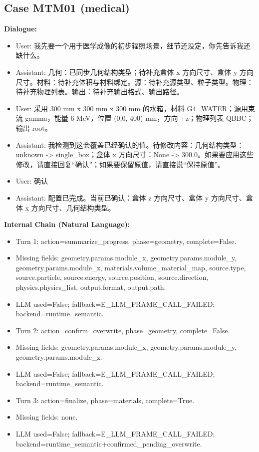 \documentclass[11pt]{ctexart}
\begin{document}
\subsection{Case MTM01 (medical)}
\textbf{Dialogue:}
\begin{itemize}
\item User: 我先要一个用于医学成像的初步辐照场景，细节还没定，你先告诉我还缺什么。
\item Assistant: 几何：已同步几何结构类型；待补充盒体 x 方向尺寸、盒体 y 方向尺寸。材料：待补充体积与材料绑定。源：待补充源类型、粒子类型。物理：待补充物理列表。输出：待补充输出格式、输出路径。
\item User: 采用 300 mm x 300 mm x 300 mm 的水箱，材料 G4\_WATER；源用束流 gamma，能量 6 MeV，位置 (0,0,-400) mm，方向 +z；物理列表 QBBC；输出 root。
\item Assistant: 我检测到这会覆盖已经确认的值。待修改内容：几何结构类型：unknown -> single\_box；盒体 x 方向尺寸：None -> 300.0。如果要应用这些修改，请直接回复“确认”；如果要保留原值，请直接说“保持原值”。
\item User: 确认
\item Assistant: 配置已完成。当前已确认：盒体 z 方向尺寸、盒体 y 方向尺寸、盒体 x 方向尺寸、几何结构类型。
\end{itemize}
\textbf{Internal Chain (Natural Language):}
\begin{itemize}
\item Turn 1: action=summarize\_progress, phase=geometry, complete=False.
\item Missing fields: geometry.params.module\_x, geometry.params.module\_y, geometry.params.module\_z, materials.volume\_material\_map, source.type, source.particle, source.energy, source.position, source.direction, physics.physics\_list, output.format, output.path.
\item LLM used=False; fallback=E\_LLM\_FRAME\_CALL\_FAILED; backend=runtime\_semantic.
\item Turn 2: action=confirm\_overwrite, phase=geometry, complete=False.
\item Missing fields: geometry.params.module\_x, geometry.params.module\_y, geometry.params.module\_z.
\item LLM used=False; fallback=E\_LLM\_FRAME\_CALL\_FAILED; backend=runtime\_semantic.
\item Turn 3: action=finalize, phase=materials, complete=True.
\item Missing fields: none.
\item LLM used=False; fallback=E\_LLM\_FRAME\_CALL\_FAILED; backend=runtime\_semantic+confirmed\_pending\_overwrite.
\end{itemize}
\end{document}

